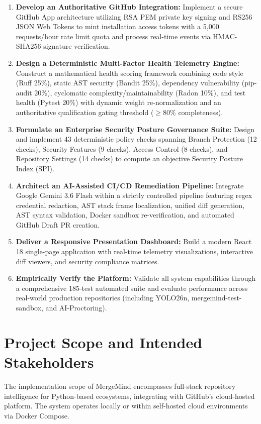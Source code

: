 \begin{enumerate}
    \item \textbf{Develop an Authoritative GitHub Integration:} Implement a secure GitHub App architecture utilizing RSA PEM private key signing and RS256 JSON Web Tokens to mint installation access tokens with a 5,000 requests/hour rate limit quota and process real-time events via HMAC-SHA256 signature verification.
    \item \textbf{Design a Deterministic Multi-Factor Health Telemetry Engine:} Construct a mathematical health scoring framework combining code style (Ruff 25\%), static AST security (Bandit 25\%), dependency vulnerability (pip-audit 20\%), cyclomatic complexity/maintainability (Radon 10\%), and test health (Pytest 20\%) with dynamic weight re-normalization and an authoritative qualification gating threshold ($\ge 80\%$ completeness).
    \item \textbf{Formulate an Enterprise Security Posture Governance Suite:} Design and implement 43 deterministic policy checks spanning Branch Protection (12 checks), Security Features (9 checks), Access Control (8 checks), and Repository Settings (14 checks) to compute an objective Security Posture Index (SPI).
    \item \textbf{Architect an AI-Assisted CI/CD Remediation Pipeline:} Integrate Google Gemini 3.6 Flash within a strictly controlled pipeline featuring regex credential redaction, AST stack frame localization, unified diff generation, AST syntax validation, Docker sandbox re-verification, and automated GitHub Draft PR creation.
    \item \textbf{Deliver a Responsive Presentation Dashboard:} Build a modern React 18 single-page application with real-time telemetry visualizations, interactive diff viewers, and security compliance matrices.
    \item \textbf{Empirically Verify the Platform:} Validate all system capabilities through a comprehensive 185-test automated suite and evaluate performance across real-world production repositories (including YOLO26n, mergemind-test-sandbox, and AI-Proctoring).
\end{enumerate}

\section{Project Scope and Intended Stakeholders}
\label{sec:scope}

The implementation scope of MergeMind encompasses full-stack repository intelligence for Python-based ecosystems, integrating with GitHub's cloud-hosted platform. The system operates locally or within self-hosted cloud environments via Docker Compose.

